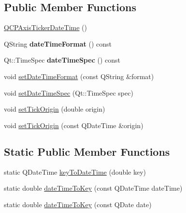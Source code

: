 \subsection*{Public Member Functions}
\begin{DoxyCompactItemize}
\item 
\hyperlink{classQCPAxisTickerDateTime_a84cc5c6bbc7c99c1f9bd4b3a392e1b9d}{Q\+C\+P\+Axis\+Ticker\+Date\+Time} ()
\item 
Q\+String {\bfseries date\+Time\+Format} () const \hypertarget{classQCPAxisTickerDateTime_a19d4302f3d58b5c05e7e943c6e7c5b57}{}\label{classQCPAxisTickerDateTime_a19d4302f3d58b5c05e7e943c6e7c5b57}

\item 
Qt\+::\+Time\+Spec {\bfseries date\+Time\+Spec} () const \hypertarget{classQCPAxisTickerDateTime_a231ff3f1e970255bf874b50fd742ff18}{}\label{classQCPAxisTickerDateTime_a231ff3f1e970255bf874b50fd742ff18}

\item 
void \hyperlink{classQCPAxisTickerDateTime_ad52660a82f688395468674d555f6a86b}{set\+Date\+Time\+Format} (const Q\+String \&format)
\item 
void \hyperlink{classQCPAxisTickerDateTime_afbd987c7197e42ab61e67fb1c38abebc}{set\+Date\+Time\+Spec} (Qt\+::\+Time\+Spec spec)
\item 
void \hyperlink{classQCPAxisTickerDateTime_a5388e048cbd32cf1ba730b9f1859eb5c}{set\+Tick\+Origin} (double origin)
\item 
void \hyperlink{classQCPAxisTickerDateTime_a2ea905872b8171847a49a5e093fb0c48}{set\+Tick\+Origin} (const Q\+Date\+Time \&origin)
\end{DoxyCompactItemize}
\subsection*{Static Public Member Functions}
\begin{DoxyCompactItemize}
\item 
static Q\+Date\+Time \hyperlink{classQCPAxisTickerDateTime_a4c1761ad057f5564804a53f942629b53}{key\+To\+Date\+Time} (double key)
\item 
static double \hyperlink{classQCPAxisTickerDateTime_aa24f293f16fff0f937bf71f4140033f1}{date\+Time\+To\+Key} (const Q\+Date\+Time date\+Time)
\item 
static double \hyperlink{classQCPAxisTickerDateTime_ad87afc7dba65843f68da5ca88bc004f4}{date\+Time\+To\+Key} (const Q\+Date date)
\end{DoxyCompactItemize}
